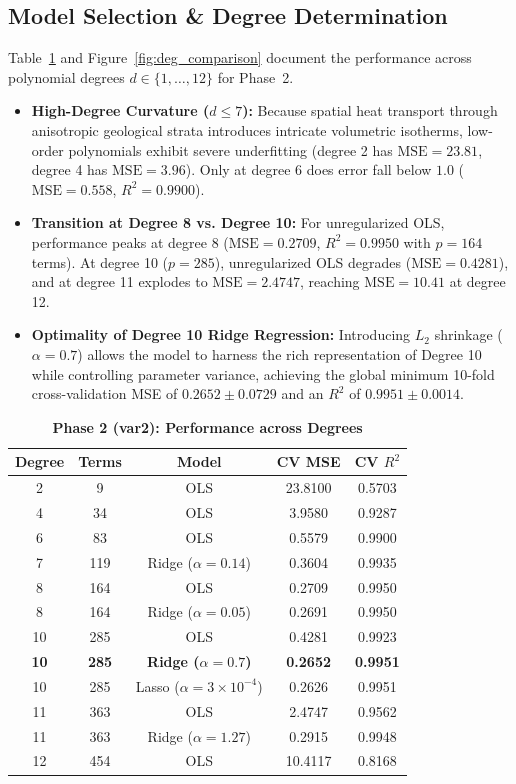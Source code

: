 \documentclass[10pt,twocolumn]{article}
\begin{document}
\subsection{Model Selection \& Degree Determination}
Table~\ref{tab:var2_perf} and Figure~\ref{fig:deg_comparison} document the performance across polynomial degrees $d \in \{1, \dots, 12\}$ for Phase~2.
\begin{itemize}\setlength{\itemsep}{1pt}
    \item \textbf{High-Degree Curvature ($d \le 7$):} Because spatial heat transport through anisotropic geological strata introduces intricate volumetric isotherms, low-order polynomials exhibit severe underfitting (degree 2 has $\text{MSE}=23.81$, degree 4 has $\text{MSE}=3.96$). Only at degree 6 does error fall below $1.0$ ($\text{MSE}=0.558$, $R^2=0.9900$).
    \item \textbf{Transition at Degree 8 vs. Degree 10:} For unregularized OLS, performance peaks at degree 8 ($\text{MSE}=0.2709$, $R^2=0.9950$ with $p=164$ terms). At degree 10 ($p=285$), unregularized OLS degrades ($\text{MSE}=0.4281$), and at degree 11 explodes to $\text{MSE}=2.4747$, reaching $\text{MSE}=10.41$ at degree 12.
    \item \textbf{Optimality of Degree 10 Ridge Regression:} Introducing $L_2$ shrinkage ($\alpha = 0.7$) allows the model to harness the rich representation of Degree 10 while controlling parameter variance, achieving the global minimum 10-fold cross-validation MSE of $\mathbf{0.2652 \pm 0.0729}$ and an $R^2$ of $\mathbf{0.9951 \pm 0.0014}$.
\end{itemize}

\begin{table}[h]
\centering
\small
\caption{\textbf{Phase 2 (var2): Performance across Degrees}}
\label{tab:var2_perf}
\begin{tabular}{ccccc}
\toprule
\textbf{Degree} & \textbf{Terms} & \textbf{Model} & \textbf{CV MSE} & \textbf{CV $R^2$} \\
\midrule
2 & 9 & OLS & 23.8100 & 0.5703 \\
4 & 34 & OLS & 3.9580 & 0.9287 \\
6 & 83 & OLS & 0.5579 & 0.9900 \\
7 & 119 & Ridge ($\alpha=0.14$) & 0.3604 & 0.9935 \\
8 & 164 & OLS & 0.2709 & 0.9950 \\
8 & 164 & Ridge ($\alpha=0.05$) & 0.2691 & 0.9950 \\
10 & 285 & OLS & 0.4281 & 0.9923 \\
\textbf{10} & \textbf{285} & \textbf{Ridge ($\alpha=0.7$)} & \textbf{0.2652} & \textbf{0.9951} \\
10 & 285 & Lasso ($\alpha=3\times 10^{-4}$) & 0.2626 & 0.9951 \\
11 & 363 & OLS & 2.4747 & 0.9562 \\
11 & 363 & Ridge ($\alpha=1.27$) & 0.2915 & 0.9948 \\
12 & 454 & OLS & 10.4117 & 0.8168 \\
\bottomrule
\end{tabular}
\end{table}
\end{document}

